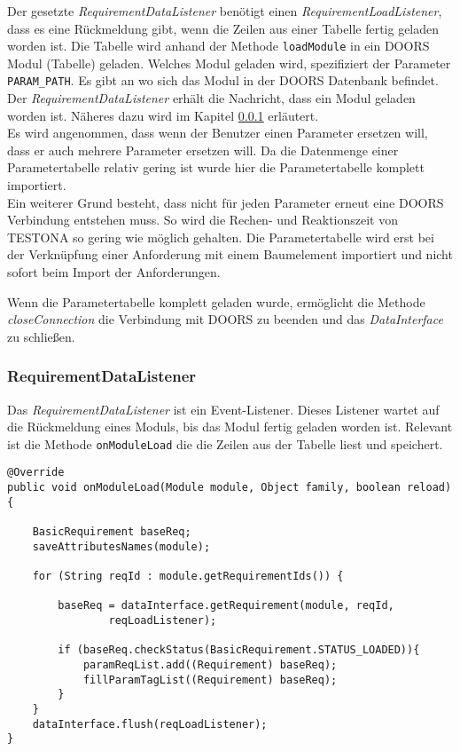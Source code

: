 Der gesetzte \textit{RequirementDataListener} benötigt einen \textit{RequirementLoadListener}, dass es eine Rückmeldung gibt, wenn die Zeilen aus einer Tabelle fertig geladen worden ist. Die Tabelle wird anhand der Methode \texttt{loadModule} in ein DOORS Modul (Tabelle) geladen. Welches Modul geladen wird, spezifiziert der Parameter \texttt{PARAM\_PATH}. Es gibt an wo sich das Modul in der DOORS Datenbank befindet. Der \textit{RequirementDataListener} erhält die Nachricht, dass ein Modul geladen worden ist. Näheres dazu wird im Kapitel \ref{sub.RequirementDataListener} erläutert.\\


Es wird angenommen, dass wenn der Benutzer einen Parameter ersetzen will, dass er auch mehrere Parameter ersetzen will. Da die Datenmenge einer Parametertabelle relativ gering ist wurde hier die Parametertabelle komplett importiert. \\


Ein weiterer Grund besteht, dass nicht für jeden Parameter erneut eine DOORS Verbindung entstehen muss. So wird die Rechen- und Reaktionszeit von TESTONA so gering wie möglich gehalten. Die Parametertabelle wird erst bei der Verknüpfung einer Anforderung mit einem Baumelement importiert und nicht sofort beim Import der Anforderungen. 

Wenn die Parametertabelle komplett geladen wurde, ermöglicht die Methode \textit{closeConnection} die Verbindung mit DOORS zu beenden und das \textit{DataInterface} zu schließen.





\subsubsection{RequirementDataListener}\label{sub.RequirementDataListener}

Das \textit{RequirementDataListener} ist ein Event-Listener. Dieses Listener wartet auf die Rückmeldung eines Moduls, bis das Modul fertig geladen worden ist. Relevant ist die Methode \texttt{onModuleLoad} die die Zeilen aus der Tabelle liest und speichert.\\

\begin{lstlisting}[caption={Laden der Parametertabelle nach Zeilen}, captionpos=b]
@Override
public void onModuleLoad(Module module, Object family, boolean reload){

	BasicRequirement baseReq;
	saveAttributesNames(module);
				
	for (String reqId : module.getRequirementIds()) {

		baseReq = dataInterface.getRequirement(module, reqId,
				reqLoadListener);

		if (baseReq.checkStatus(BasicRequirement.STATUS_LOADED)){
			paramReqList.add((Requirement) baseReq);
			fillParamTagList((Requirement) baseReq);
		}
	}
	dataInterface.flush(reqLoadListener);
}
\end{lstlisting}

